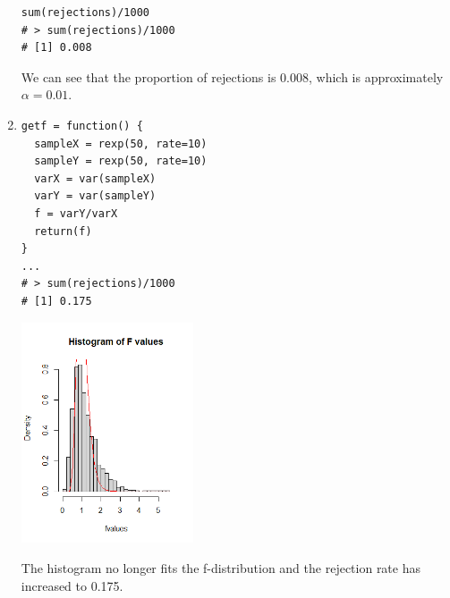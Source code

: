 \documentclass{article}
\begin{document}
\begin{enumerate}
\begin{lstlisting}
sum(rejections)/1000
# > sum(rejections)/1000
# [1] 0.008
	\end{lstlisting}
	We can see that the proportion of rejections is $0.008$, 
	which is approximately $\alpha = 0.01$.
	\item \begin{lstlisting}
getf = function() {
  sampleX = rexp(50, rate=10)
  sampleY = rexp(50, rate=10)
  varX = var(sampleX)
  varY = var(sampleY)
  f = varY/varX
  return(f)
}
...
# > sum(rejections)/1000
# [1] 0.175
	\end{lstlisting}
	\includegraphics*[width=0.4\textwidth]{exercise1c.png}

	The histogram no longer fits the f-distribution and the rejection rate 
	has increased to 0.175.
\end{enumerate}
\newpage 
\end{document}
